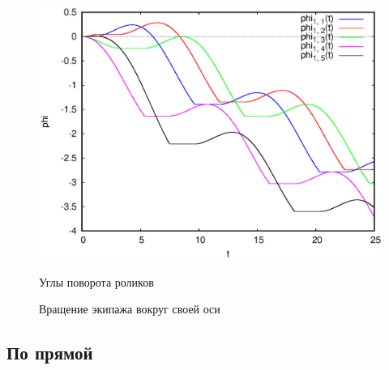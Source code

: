 \begin{figure}[h]
{        \includegraphics[scale=0.33]{pic/self_rot_25/rol_ang.eps}
        \caption{Углы поворота роликов}
        \label{fig:self_rot_25_rol_ang}
    }
    \caption{Вращение экипажа вокруг своей оси}
\end{figure}
\label{fig:self_rot}

\newpage

\subsection{По прямой}

